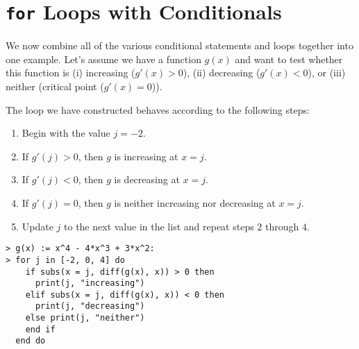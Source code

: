 

\section{\texttt{for} Loops with Conditionals}

We now combine all of the various conditional statements and loops together into one example. Let's assume we have a function $g(x)$ and want to test whether this function is (i) increasing ($g'(x) > 0$), (ii) decreasing ($g'(x) < 0$), or (iii) neither (critical point ($g'(x) = 0$)).

The loop we have constructed behaves according to the following steps:


\begin{enumerate}
	\item Begin with the value $j=-2$.
	\item If $g'(j)>0$, then $g$ is increasing at $x=j$.
	\item If $g'(j)<0$, then $g$ is decreasing at $x=j$.
	\item If $g'(j)=0$, then $g$ is neither increasing nor decreasing at $x=j$.
	\item Update $j$ to the next value in the list and repeat steps $2$ through $4$.
\end{enumerate}

\begin{maplegroup}
\begin{mapleinput}
\begin{verbatim}
> g(x) := x^4 - 4*x^3 + 3*x^2:
> for j in [-2, 0, 4] do
    if subs(x = j, diff(g(x), x)) > 0 then
      print(j, "increasing")
    elif subs(x = j, diff(g(x), x)) < 0 then
      print(j, "decreasing")
    else print(j, "neither")
    end if
  end do
\end{verbatim}
\end{mapleinput}
\mapleresult
\begin{maplelatex}
\end{maplelatex}
\mapleresult
\begin{maplelatex}
\end{maplelatex}
\mapleresult
\begin{maplelatex}
\end{maplelatex}
\end{maplegroup}


